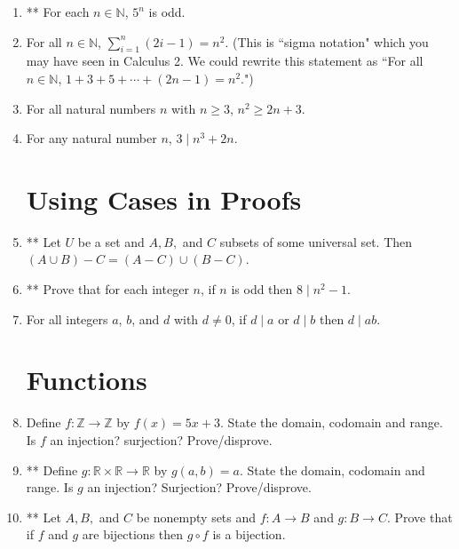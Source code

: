 \documentclass[12pt]{amsart}
\theoremstyle{definition}
\newcommand{\Z}{\mathbb{Z}}
\newcommand{\N}{\mathbb{N}}
\newcommand{\R}{\mathbb{R}}
\begin{document}
\begin{enumerate}

\item ** For each $n\in\mathbb{N}$, $5^n$ is odd.\\

\item For all $n\in\mathbb{N}$,  $\displaystyle{\sum_{i=1}^n (2i-1) = n^2}$. (This is ``sigma notation" which you may have seen in Calculus 2. We could rewrite this statement as ``For all $n\in\N$, $1+3+5+\cdots + (2n-1) = n^2$.") \\

\item For all natural numbers $n$ with $n\geq 3$, $n^2\geq 2n+3$.\\

\item For any natural number $n$, $3\mid n^3+2n$.\\

\section{Using Cases in Proofs}

\item ** Let $U$ be a set and $A, B,$ and $C$ subsets of some universal set. Then $(A\cup B) - C = (A-C)\cup (B-C)$.\\

\item ** Prove that for each integer $n$, if $n$ is odd then $8\mid n^2-1$.\\

\item For all integers $a$, $b$, and $d$ with $d\neq 0$, if $d \mid a$ or $d\mid b$ then $d\mid ab$.


\section{Functions}

\item Define $f: \Z \to \Z$ by $f(x) = 5x+3$. State the domain, codomain and range. Is $f$ an injection? surjection? Prove/disprove.\\

\item ** Define $g: \R\times\R \to\R$ by $g(a,b) = a$. State the domain, codomain and range. Is $g$ an injection? Surjection? Prove/disprove.\\

\item ** Let $A,B,$ and $C$ be nonempty sets and $f:A\to B$ and $g: B\to C$. Prove that if $f$ and $g$ are bijections then $g\circ f$ is a bijection. \\



\end{enumerate}
\end{document}
